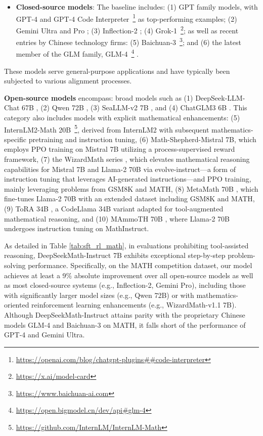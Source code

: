 \begin{itemize}[topsep=0pt]
    \item \textbf{Closed-source models}: The baseline includes: (1) GPT family models, with GPT-4 \citep{gpt4} and GPT-4 Code Interpreter~\footnote{\url{https://openai.com/blog/chatgpt-plugins\#\#code-interpreter}} as top-performing examples; (2) Gemini Ultra and Pro \citep{gemini}; (3) Inflection-2 \citep{inflection-2}; (4) Grok-1~\footnote{\url{https://x.ai/model-card}}; as well as recent entries by Chinese technology firms: (5) Baichuan-3~\footnote{\url{https://www.baichuan-ai.com}}; and (6) the latest member of the GLM family, GLM-4~\footnote{\url{https://open.bigmodel.cn/dev/api\#glm-4}} \citep{glm}.
\end{itemize}

These models serve general-purpose applications and have typically been subjected to various alignment processes.
    \item \textbf{Open-source models} encompass: broad models such as (1) DeepSeek-LLM-Chat 67B \citep{deepseek-llm}, (2) Qwen 72B \citep{qwen}, (3) SeaLLM-v2 7B \citep{seallm}, and (4) ChatGLM3 6B \citep{chatglm3}. This category also includes models with explicit mathematical enhancements: (5) InternLM2-Math 20B~\footnote{\url{https://github.com/InternLM/InternLM-Math}}, derived from InternLM2 with subsequent mathematics-specific pretraining and instruction tuning, (6) Math-Shepherd-Mistral 7B, which employs PPO training \citep{schulman2017proximal} on Mistral 7B \citep{mistral} utilizing a process-supervised reward framework, (7) the WizardMath series \citep{wizardmath}, which elevates mathematical reasoning capabilities for Mistral 7B and Llama-2 70B \citep{llama2} via evolve-instruct—a form of instruction tuning that leverages AI-generated instructions—and PPO training, mainly leveraging problems from GSM8K and MATH, (8) MetaMath 70B \citep{metamath}, which fine-tunes Llama-2 70B with an extended dataset including GSM8K and MATH, (9) ToRA 34B \cite{tora}, a CodeLlama 34B variant adapted for tool-augmented mathematical reasoning, and (10) MAmmoTH 70B \citep{MathInstruct}, where Llama-2 70B undergoes instruction tuning on MathInstruct.

As detailed in Table \ref{tab:sft_rl_math}, in evaluations prohibiting tool-assisted reasoning, DeepSeekMath-Instruct 7B exhibits exceptional step-by-step problem-solving performance. Specifically, on the MATH competition dataset, our model achieves at least a 9\% absolute improvement over all open-source models as well as most closed-source systems (e.g., Inflection-2, Gemini Pro), including those with significantly larger model sizes (e.g., Qwen 72B) or with mathematics-oriented reinforcement learning enhancements (e.g., WizardMath-v1.1 7B). Although DeepSeekMath-Instruct attains parity with the proprietary Chinese models GLM-4 and Baichuan-3 on MATH, it falls short of the performance of GPT-4 and Gemini Ultra.

